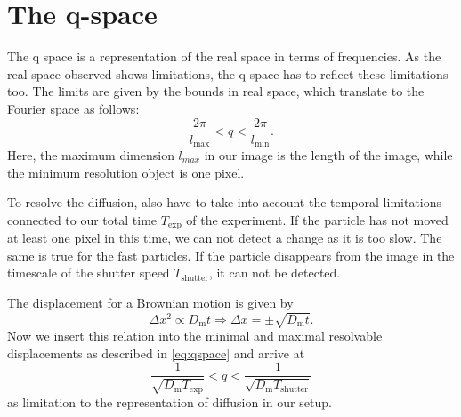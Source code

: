 \section{The q-space}
\label{sec:qSpace}

The q space is a representation of the real space in terms of frequencies. As the real space observed shows limitations, 
the q space has to reflect these limitations too. The limits are given by the bounds in real space, which translate to the 
Fourier space as follows:
\begin{equation}
    \frac{2\pi}{l_{\mathrm{max}}}<q < \frac{2\pi}{l_{\mathrm{min}}}.
    \label{eq:qspace}
\end{equation}
Here, the maximum dimension $l_{max}$ in our image is the length of the image, while the minimum resolution object is one pixel. 

To resolve the diffusion, also have to take into account the temporal limitations connected to our total time $T_{\mathrm{exp}}$ of the experiment. If the 
particle has not moved at least one pixel in this time, we can not detect a change as it is too slow. The same is true for the fast particles. If the particle
disappears from the image in the timescale of the shutter speed $T_{\mathrm{shutter}} $, it can not be detected.  

The displacement for a Brownian motion is given by 
\begin{equation}
    \Delta x^2 \propto  D_{\mathrm{m}} t   \Rightarrow \Delta x = \pm \sqrt{D_{\mathrm{m}} t}.
\end{equation}
Now we insert this relation into the minimal and maximal resolvable displacements as described in \cref{eq:qspace} and arrive at 
\begin{equation}
    \frac{1}{\sqrt{D_{\mathrm{m}} T_{\mathrm{exp}}}} < q < \frac{1}{\sqrt{D_{\mathrm{m}} T_{\mathrm{shutter}}}}
\end{equation}
as limitation to the representation of diffusion in our setup. 